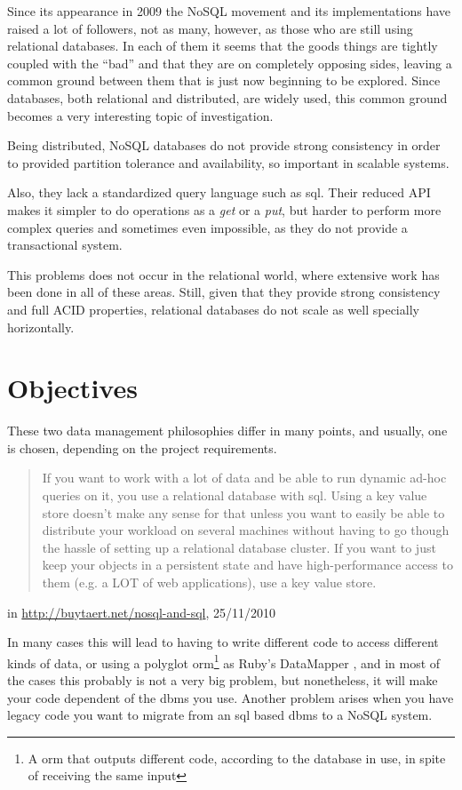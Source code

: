 Since its appearance in 2009 the NoSQL movement and its implementations have raised a lot of followers, not as many, however, as those who are still using relational databases. In each of them it seems that the goods things are tightly coupled with the ``bad'' and that they are on completely opposing sides, leaving a common ground between them that is just now beginning to be explored. Since databases, both relational and distributed, are widely used, this common ground becomes a very interesting topic of investigation.

Being distributed, NoSQL databases do not provide strong consistency in order to provided partition tolerance and availability, so important in scalable systems.

Also, they lack a standardized query language such as \ac{sql}. Their reduced API makes it simpler to do operations as a \emph{get} or a \emph{put}, but harder to perform more complex queries and sometimes even impossible, as they do not provide a transactional system. 

This problems does not occur in the relational world, where extensive work has been done in all of these areas. Still, given that they provide strong consistency and full ACID properties, relational databases do not scale as well specially horizontally.

\section{Objectives}

These two data management philosophies differ in many points, and usually, one is chosen, depending on the project requirements.
\begin{quote}
If you want to work with a lot of data and be able to run dynamic ad-hoc queries on it, you use a relational database with \ac{sql}. Using a key value store doesn't make any sense for that unless you want to easily be able to distribute your workload on several machines without having to go though the hassle of setting up a relational database cluster. If you want to just keep your objects in a persistent state and have high-performance access to them (e.g. a LOT of web applications), use a key value store.
\end{quote} 
\begin{flushright}in \url{http://buytaert.net/nosql-and-sql}, 25/11/2010\end{flushright}
	
In many cases this will lead to having to write different code to access different kinds of data, or using a polyglot \ac{orm}\footnote{A orm that outputs different code, according to the database in use, in spite of receiving the same input} as Ruby's DataMapper \cite{DM}, and in most of the cases this probably is not a very big problem, but nonetheless, it will make your code dependent of the \ac{dbms} you use. Another problem arises when you have legacy code you want to migrate from an \ac{sql} based \ac{dbms} to a NoSQL system. 	
 

